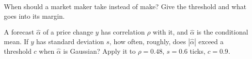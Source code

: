 \begin{interviewq}\label{iq:hf:short-horizon-alpha:5}
When should a market maker take instead of make? Give the threshold and what goes into its margin.
\end{interviewq}

\begin{interviewq}\label{iq:hf:short-horizon-alpha:6}
A forecast $\hat\alpha$ of a price change $y$ has correlation $\rho$ with it, and $\hat\alpha$ is the conditional mean. If $y$ has standard deviation
$s$, how often, roughly, does $|\hat\alpha|$ exceed a threshold $c$ when $\hat\alpha$ is Gaussian? Apply it to $\rho=0.48$, $s=0.6$ ticks, $c=0.9$.
\end{interviewq}
